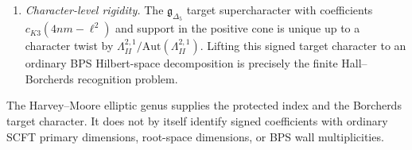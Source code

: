 \begin{theorem}
\begin{enumerate}[label=\textup{(\roman*)}]
 $\dim\mathfrak g_{\Delta_5,\gamma,\bar1}$, and
 $\dim\mathfrak g_{\Delta_5,\gamma}$ are not determined by
 $c_{K3}(D)$ alone.
\item \emph{Character-level rigidity.} The
 $\mathfrak g_{\Delta_5}$ target supercharacter with coefficients
 $c_{K3}(4nm-\ell^2)$ and support in the positive cone is unique
 up to a character twist by
 $\Lambda^{2,1}_{II}/\mathrm{Aut}(\Lambda^{2,1}_{II})$. Lifting this
 signed target character to an ordinary BPS Hilbert-space
 decomposition is precisely the finite Hall--Borcherds recognition
 problem.
\end{enumerate}
The Harvey--Moore elliptic genus supplies the protected index and the
Borcherds target character. It does not by itself identify signed
coefficients with ordinary SCFT primary dimensions, root-space
dimensions, or BPS wall multiplicities.
\end{theorem}

